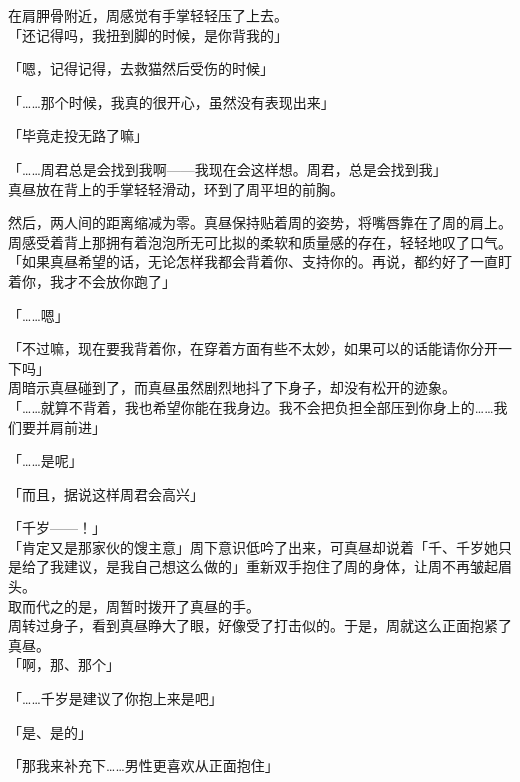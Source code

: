 在肩胛骨附近，周感觉有手掌轻轻压了上去。\\

「还记得吗，我扭到脚的时候，是你背我的」

「嗯，记得记得，去救猫然后受伤的时候」

「……那个时候，我真的很开心，虽然没有表现出来」

「毕竟走投无路了嘛」

「……周君总是会找到我啊——我现在会这样想。周君，总是会找到我」\\

真昼放在背上的手掌轻轻滑动，环到了周平坦的前胸。

然后，两人间的距离缩减为零。真昼保持贴着周的姿势，将嘴唇靠在了周的肩上。\\

周感受着背上那拥有着泡泡所无可比拟的柔软和质量感的存在，轻轻地叹了口气。\\

「如果真昼希望的话，无论怎样我都会背着你、支持你的。再说，都约好了一直盯着你，我才不会放你跑了」

「……嗯」

「不过嘛，现在要我背着你，在穿着方面有些不太妙，如果可以的话能请你分开一下吗」\\

周暗示真昼碰到了，而真昼虽然剧烈地抖了下身子，却没有松开的迹象。\\

「……就算不背着，我也希望你能在我身边。我不会把负担全部压到你身上的……我们要并肩前进」

「……是呢」

「而且，据说这样周君会高兴」

「千岁——！」\\

「肯定又是那家伙的馊主意」周下意识低吟了出来，可真昼却说着「千、千岁她只是给了我建议，是我自己想这么做的」重新双手抱住了周的身体，让周不再皱起眉头。\\

取而代之的是，周暂时拨开了真昼的手。\\

周转过身子，看到真昼睁大了眼，好像受了打击似的。于是，周就这么正面抱紧了真昼。\\

「啊，那、那个」

「……千岁是建议了你抱上来是吧」

「是、是的」

「那我来补充下……男性更喜欢从正面抱住」\\

